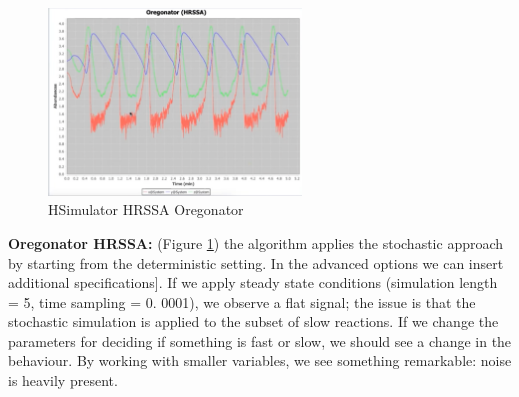 \begin{figure}
  \centering
  \includegraphics[width=0.6\textwidth]{HRSSA_oregonator.png}
  \caption{HSimulator HRSSA Oregonator}
  \label{fig:oregonator}
\end{figure}
\noindent
\textbf{Oregonator HRSSA:} (Figure \ref{fig:oregonator})  the algorithm applies the stochastic approach by starting from the deterministic setting.
In the advanced options we can insert additional specifications{]}.
If we apply steady state conditions (simulation length = 5, time sampling = 0.
0001), we observe a flat signal; the issue is that the stochastic simulation is applied to the subset of slow reactions.
If we change the parameters for deciding if something is fast or slow, we should see a change in the behaviour.
By working with smaller variables, we see something remarkable: noise is heavily present.

